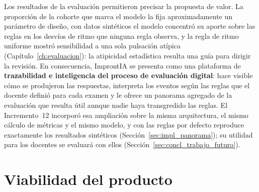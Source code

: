 Los resultados de la evaluación permitieron precisar la propuesta de valor. La proporción de la cohorte que marca el modelo la fija aproximadamente un parámetro de diseño, con datos sintéticos el modelo concentró su aporte sobre las reglas en los desvíos de ritmo que ninguna regla observa, y la regla de ritmo uniforme mostró sensibilidad a una sola pulsación atípica (Capítulo~\ref{ch:evaluacion}): la atipicidad estadística resulta una guía para dirigir la revisión. En consecuencia, ImprontIA se presenta como una plataforma de \textbf{trazabilidad e inteligencia del proceso de evaluación digital}: hace visible cómo se produjeron las respuestas, interpreta los eventos según las reglas que el docente definió para cada examen y le ofrece un panorama agregado de la evaluación que resulta útil aunque nadie haya transgredido las reglas. El Incremento~12 incorporó esa ampliación sobre la misma arquitectura, el mismo cálculo de métricas y el mismo modelo, y con las reglas por defecto reproduce exactamente los resultados sintéticos (Sección~\ref{sec:impl_panorama}); su utilidad para los docentes se evaluará con ellos (Sección~\ref{sec:concl_trabajo_futuro}).

\section{Viabilidad del producto}
\label{sec:concl_viabilidad}

